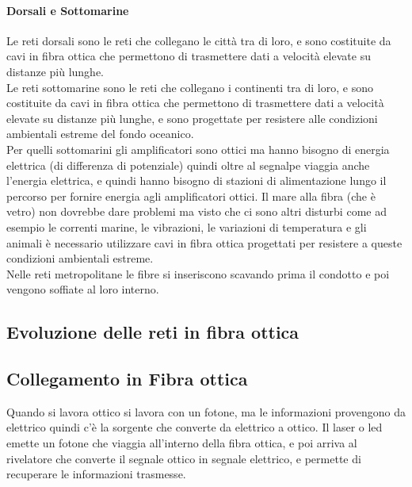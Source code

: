 \paragraph{Dorsali e Sottomarine}

Le reti dorsali sono le reti che collegano le città tra di loro, e sono costituite da cavi in fibra ottica che permettono di trasmettere dati a velocità elevate su distanze più lunghe.\\
Le reti sottomarine sono le reti che collegano i continenti tra di loro, e sono costituite da cavi in fibra ottica che permettono di trasmettere dati a velocità elevate su distanze più lunghe, e sono progettate per resistere alle condizioni ambientali estreme del fondo oceanico.\\

Per quelli sottomarini gli amplificatori sono ottici ma hanno bisogno di energia elettrica (di differenza di potenziale) quindi oltre al segnalpe viaggia anche l'energia elettrica, e quindi hanno bisogno di stazioni di alimentazione lungo il percorso per fornire energia agli amplificatori ottici.
Il mare alla fibra (che è vetro) non dovrebbe dare problemi ma visto che ci sono altri disturbi come ad esempio le correnti marine, le vibrazioni, le variazioni di temperatura e gli animali è necessario utilizzare cavi in fibra ottica progettati per resistere a queste condizioni ambientali estreme.\\

Nelle reti metropolitane le fibre si inseriscono scavando prima il condotto e poi vengono soffiate al loro interno.\\

\subsection{Evoluzione delle reti in fibra ottica}

\subsection{Collegamento in Fibra ottica}

Quando si lavora ottico si lavora con un fotone, ma le informazioni provengono da elettrico quindi c'è la sorgente che converte da elettrico a ottico. 
Il laser o led emette un fotone che viaggia all'interno della fibra ottica, e poi arriva al rivelatore che converte il segnale ottico in segnale elettrico, e permette di recuperare le informazioni trasmesse.\\

